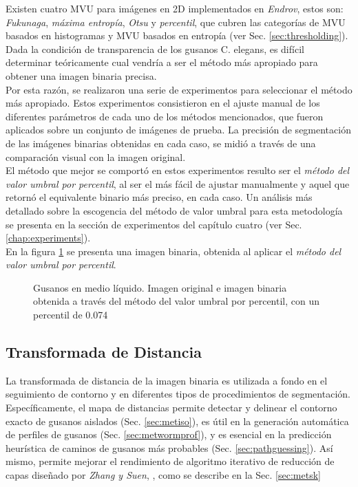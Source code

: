 Existen cuatro MVU para im\'agenes en 2D implementados en \emph{Endrov},
estos son: \emph{Fukunaga}, \emph{m\'axima entrop\'ia}, \emph{Otsu} y \emph{percentil},
que cubren las categor\'ias de MVU basados en histogramas y MVU basados en entrop\'ia 
(ver Sec. \ref{sec:thresholding}). Dada la condici\'on de transparencia de los gusanos
C. elegans, es dif\'icil determinar te\'oricamente cual vendr\'ia a ser el m\'etodo m\'as apropiado 
para obtener una imagen binaria precisa. \\
Por esta raz\'on, se realizaron una serie de experimentos
para seleccionar el m\'etodo m\'as apropiado. Estos experimentos consistieron en el ajuste manual
de los diferentes par\'ametros de cada uno de los m\'etodos mencionados, que fueron aplicados
sobre un conjunto de im\'agenes de prueba. La precisi\'on de segmentaci\'on de las im\'agenes binarias
obtenidas en cada caso, se midi\'o a trav\'es de una comparaci\'on visual con la imagen original.\\
El m\'etodo que mejor se comport\'o en estos experimentos resulto ser el 
\emph{m\'etodo del valor umbral por percentil}, 
al ser el m\'as f\'acil de ajustar manualmente y aquel que retorn\'o el equivalente binario m\'as preciso, 
en cada caso. Un an\'alisis m\'as detallado sobre la escogencia del m\'etodo de valor umbral para esta metodolog\'ia
se presenta en la secci\'on de experimentos del cap\'itulo cuatro (ver Sec. \ref{chap:experiments}).\\

En la figura \ref{fig:wormthres} se presenta una imagen binaria, obtenida al
aplicar el \emph{m\'etodo del valor umbral por percentil}.

\begin{figure}[h t b p ! H]
  \centering
\qquad
\caption{Gusanos en medio l\'iquido. Imagen original e imagen binaria obtenida a trav\'es
del m\'etodo del valor umbral por percentil, con un percentil de 0.074}
  \label{fig:wormthres}
\end{figure}

\subsection{Transformada de Distancia}
\label{sec:metdt}

La transformada de distancia de la imagen binaria es utilizada a fondo en el
seguimiento de contorno y en diferentes tipos de procedimientos de segmentaci\'on.
Espec\'ificamente, el mapa de distancias permite detectar y delinear el contorno
exacto de gusanos aislados (Sec. \ref{sec:metiso}), es \'util en la generaci\'on
autom\'atica de perfiles de gusanos (Sec. \ref{sec:metwormprof}), y es esencial en 
la predicci\'on heur\'istica de caminos de gusanos m\'as probables (Sec. \ref{sec:pathguessing}). 
As\'i mismo, permite mejorar el rendimiento de algoritmo iterativo de reducci\'on de capas
dise\~nado por \emph{Zhang y Suen}, \cite{thinning}, como se describe en 
la Sec. \ref{sec:metsk}

